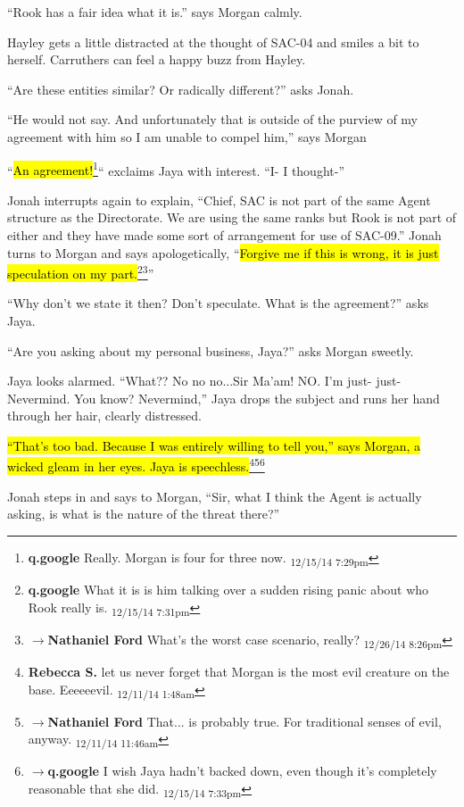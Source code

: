 ``Rook has a fair idea what it is.'' says Morgan calmly.

Hayley gets a little distracted at the thought of SAC-04 and smiles a bit to herself.  Carruthers can feel a happy buzz from Hayley.

``Are these entities similar? Or radically different?'' asks Jonah.

``He would not say.  And unfortunately that is outside of the purview of my agreement with him so I am unable to compel him,'' says Morgan

``\hl{An agreement!}\footnote{\textbf{q.google }Really.  Morgan is four for three now. \textsubscript{12/15/14 7:29pm}}`` exclaims Jaya with interest. ``I- I thought-''

Jonah interrupts again to explain, ``Chief, SAC is not part of the same Agent structure as the Directorate.  We are using the same ranks but Rook is not part of either and they have made some sort of arrangement for use of SAC-09.''  Jonah turns to Morgan and says apologetically, ``\hl{Forgive me if this is wrong, it is just speculation on my part.}\footnote{\textbf{q.google }What it is is him talking over a sudden rising panic about who Rook really is. \textsubscript{12/15/14 7:31pm}}\footnote{$\rightarrow$\textbf{Nathaniel Ford }What's the worst case scenario, really? \textsubscript{12/26/14 8:26pm}}''

``Why don't we state it then?  Don't speculate.  What is the agreement?'' asks Jaya.

``Are you asking about my personal business, Jaya?'' asks Morgan sweetly.

Jaya looks alarmed.  ``What?? No no no...Sir Ma'am!  NO.  I'm just- just-  Nevermind.  You know?  Nevermind,'' Jaya drops the subject and runs her hand through her hair, clearly distressed.

\hl{``That's too bad.  Because I was entirely willing to tell you,'' says Morgan, a wicked gleam in her eyes.  Jaya is speechless.}\footnote{\textbf{Rebecca S. }let us never forget that Morgan is the most evil creature on the base. Eeeeeevil. \textsubscript{12/11/14 1:48am}}\footnote{$\rightarrow$\textbf{Nathaniel Ford }That... is probably true. For traditional senses of evil, anyway. \textsubscript{12/11/14 11:46am}}\footnote{$\rightarrow$\textbf{q.google }I wish Jaya hadn't backed down, even though it's completely reasonable that she did. \textsubscript{12/15/14 7:33pm}}

Jonah steps in and says to Morgan, ``Sir, what I think the Agent is actually asking, is what is the nature of the threat there?''

